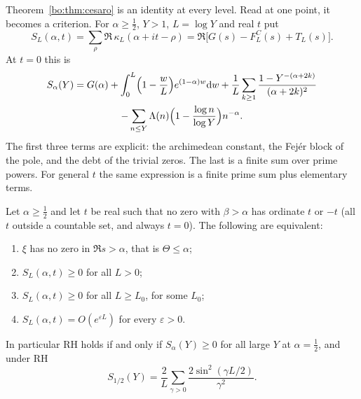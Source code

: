 Theorem~\ref{bo:thm:cesaro} is an identity at every level. Read at one point, it becomes a criterion. For $\alpha\ge\frac12$, $Y>1$, $L=\log Y$ and real $t$ put
\[
S_L(\alpha,t)=\sum_\rho\Re\,\kappa_L(\alpha+it-\rho)=\Re\bigl[G(s)-F^C_L(s)+T_L(s)\bigr].
\]
At $t=0$ this is
\begin{multline*}
S_\alpha(Y)=G(\alpha)+\int_0^L\Bigl(1-\frac wL\Bigr)e^{(1-\alpha)w}\mathrm{d} w+\frac1L\sum_{k\ge1}\frac{1-Y^{-(\alpha+2k)}}{(\alpha+2k)^2}\\
-\sum_{n\le Y}\Lambda(n)\Bigl(1-\frac{\log n}{\log Y}\Bigr)n^{-\alpha}.
\end{multline*}
The first three terms are explicit: the archimedean constant, the Fej\'er block of the pole, and the debt of the trivial zeros. The last is a finite sum over prime powers. For general $t$ the same expression is a finite prime sum plus elementary terms.

\begin{theorem}\label{bo:thm:fejer}
Let $\alpha\ge\frac12$ and let $t$ be real such that no zero with $\beta>\alpha$ has ordinate $t$ or $-t$ (all $t$ outside a countable set, and always $t=0$). The following are equivalent:
\begin{enumerate}
\item $\xi$ has no zero in $\Re s>\alpha$, that is $\Theta\le\alpha$;
\item $S_L(\alpha,t)\ge0$ for all $L>0$;
\item $S_L(\alpha,t)\ge0$ for all $L\ge L_0$, for some $L_0$;
\item $S_L(\alpha,t)=O(e^{\varepsilon L})$ for every $\varepsilon>0$.
\end{enumerate}
In particular RH holds if and only if $S_\alpha(Y)\ge0$ for all large $Y$ at $\alpha=\frac12$, and under RH
\[
S_{1/2}(Y)=\frac2L\sum_{\gamma>0}\frac{2\sin^2(\gamma L/2)}{\gamma^2}.
\]
\end{theorem}

